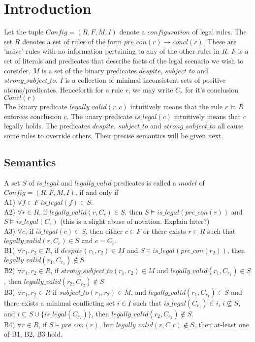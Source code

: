 \section{Introduction}

Let the tuple $Config = (R,F,M,I)$ denote a $configuration$ of legal rules. The set $R$ denotes a set of rules of the form $pre\_con(r)\rightarrow concl(r)$. These are 'naive' rules with no information pertaining to any of the other rules in $R$. $F$ is a set of literals and predicates that describe facts of the legal scenario we wish to consider. $M$ is a set of the binary predicates $despite$, $subject\_to$ and $strong\_subject\_to$. $I$ is a collection of minimal inconsistent sets of positive atoms/predicates. Henceforth for a rule $r$, we may write $C_{r}$ for it's conclusion $Concl(r)$ \\
\newline
The binary predicate $legally\_valid(r,c)$ intuitively means that the rule $r$ in $R$ enforces conclusion $c$. The unary predicate $is\_legal(c)$ intuitively means that $c$ legally holds. The predicates $despite$, $subject\_to$ and $strong\_subject\_to$ all cause some rules to override others. Their precise semantics will be given next.
\subsection{Semantics}
A set $S$ of $is\_legal$ and $legally\_valid$ predicates is called a $model$ of $Config = (R,F,M,I)$, if and only if\\
\newline
A1) $\forall f \in F$ $is\_legal(f) \in S$.\\
\newline
A2) $\forall r \in R$, if $legally\_valid(r,C_{r}) \in S$. then $S\models is\_legal(pre\_con(r))$ and $S\models is\_legal(C_{r})$ (this is a slight abuse of notation. Explain later?) \\
\newline
A3) $\forall c$, if $is\_legal(c) \in S$, then either $c\in F$ or there exists $r \in R$ such that $legally\_valid(r,C_{r}) \in S$ and $c= C_{r}$.\\
\newline
B1) $\forall r_{1}, r_{2} \in R$, if $despite(r_{1}, r_{2}) \in M$ and $S\models is\_legal(pre\_con(r_{2}))$, then $legally\_valid(r_{1},C_{r_{1}}) \notin S$\\
\newline
B2) $\forall r_{1}, r_{2} \in R$, if $strong\_subject\_to(r_{1}, r_{2}) \in M$ and $legally\_valid(r_{1},C_{r_{1}}) \in S$, then $legally\_valid(r_{2},C_{r_{2}}) \notin S$\\
\newline
B3) $\forall r_{1},r_{2} \in R$ if $subject\_to(r_{1},r_{2}) \in M$, and $legally\_valid(r_{1},C_{r_{1}}) \in S$ and there exists a minimal conflicting set $i \in I$ such that $is\_legal(C_{r_{1}}) \in i$, $i\not\subseteq S$, and $i\subseteq S\cup \{is\_legal(C_{r_{2}})\}$, then $legally\_valid(r_{2},C_{r_{2}}) \notin S$.\\
\newline
B4) $\forall r\in R$, if $S\models pre\_con(r)$, but $legally\_valid(r,C\_{r})\notin S$, then at-least one of B1, B2, B3 hold.


